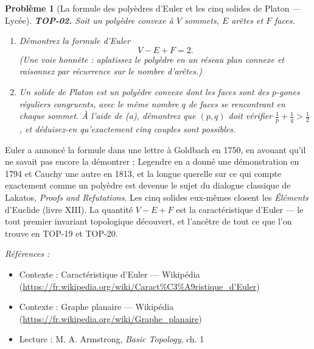 \documentclass[11pt]{article}
\newtheorem{problem}{Problème}
\newenvironment{refs}{\par\small\noindent\emph{Références :}\begin{itemize}\setlength\itemsep{0pt}}{\end{itemize}\normalsize}
\begin{document}
\bigskip

\begin{problem}[{La formule des polyèdres d'Euler et les cinq solides de Platon --- Lycée}]
\textbf{TOP-02.} Soit un polyèdre convexe à $ V $ sommets, $ E $ arêtes et $ F $
faces.
\begin{enumerate}
\item[(a)] Démontrez la formule d'Euler
\[ V - E + F = 2 . \]
(Une voie honnête : aplatissez le polyèdre en un réseau plan connexe et raisonnez par récurrence sur
le nombre d'arêtes.)
\item[(b)] Un solide de Platon est un polyèdre convexe dont les faces sont des $ p $-gones réguliers
congruents, avec le même nombre $ q $ de faces se rencontrant en chaque sommet. À l'aide de (a),
démontrez que $ (p, q) $ doit vérifier $ \frac{1}{p} + \frac{1}{q} > \frac{1}{2} $, et
déduisez-en qu'exactement cinq couples sont possibles.
\end{enumerate}

\end{problem}

\noindent Euler a annoncé la formule dans une lettre à Goldbach en 1750, en avouant qu'il ne
savait pas encore la démontrer ; Legendre en a donné une démonstration en 1794 et Cauchy une autre en
1813, et la longue querelle sur ce qui compte exactement comme un \og{} polyèdre \fg{} est devenue le sujet du
dialogue classique de Lakatos, \textit{Proofs and Refutations}. Les cinq solides eux-mêmes closent les
\textit{Éléments} d'Euclide (livre XIII). La quantité $ V - E + F $ est la caractéristique d'Euler --- le
tout premier invariant topologique découvert, et l'ancêtre de tout ce que l'on trouve en TOP-19 et
TOP-20.

\begin{refs}
\item Contexte : Caractéristique d'Euler --- Wikipédia (\url{https://fr.wikipedia.org/wiki/Caract%C3%A9ristique_d'Euler})
\item Contexte : Graphe planaire --- Wikipédia (\url{https://fr.wikipedia.org/wiki/Graphe_planaire})
\item Lecture : M. A. Armstrong, \textit{Basic Topology}, ch. 1
\end{refs}

\bigskip
\end{document}
